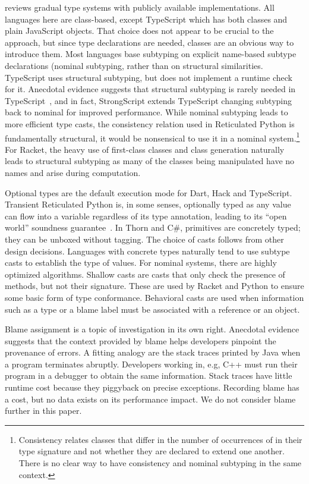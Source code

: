 \documentclass[runnningheads]{tex/llncs}
\begin{document}
 reviews gradual type systems with publicly available
implementations. All languages here are class-based, except TypeScript which
has both classes and plain JavaScript objects. That choice does not appear
to be crucial to the approach, but since type declarations are needed,
classes are an obvious way to introduce them.  Most languages base subtyping
on explicit name-based subtype declarations (nominal subtyping, rather than
on structural similarities.  TypeScript uses structural subtyping, but does
not implement a runtime check for it.  Anecdotal evidence suggests that
structural subtyping is rarely needed in TypeScript~\cite{ecoop15}, and in
fact, StrongScript extends TypeScript changing subtyping back to nominal for
improved performance. While nominal subtyping leads to more efficient type
casts, the consistency relation used in Reticulated Python is fundamentally
structural, it would be nonsensical to use it in a nominal
system.\footnote{Consistency relates classes that differ in the number of
  occurrences of \any in their type signature and not whether they are
  declared to extend one another. There is no clear way to have consistency
  and nominal subtyping in the same context.}  For Racket, the heavy use of
first-class classes and class generation naturally leads to structural
subtyping as many of the classes being manipulated have no names and arise
during computation.

Optional types are the default execution mode for Dart, Hack and TypeScript.
Transient Reticulated Python is, in some senses, optionally typed as any
value can flow into a variable regardless of its type annotation, leading to
its ``open world'' soundness guarantee~\cite{siek14}.  In Thorn and C\#,
primitives are concretely typed; they can be unboxed without tagging.  The
choice of casts follows from other design decisions. Languages with concrete
types naturally tend to use subtype casts to establish the type of
values. For nominal systems, there are highly optimized algorithms. Shallow
casts are casts that only check the presence of methods, but not their
signature. These are used by Racket and Python to ensure some basic form of
type conformance. Behavioral casts are used when information such as a type
or a blame label must be associated with a reference or an object.

Blame assignment is a topic of investigation in its own right. Anecdotal
evidence suggests that the context provided by blame helps developers
pinpoint the provenance of errors. A fitting analogy are the stack traces
printed by Java when a program terminates abruptly. Developers working in,
e.g, C++ must run their program in a debugger to obtain the same
information. Stack traces have little runtime cost because they piggyback on
precise exceptions. Recording blame has a cost, but no data exists on its
performance impact. We do not consider blame further in this paper.
\end{document}

